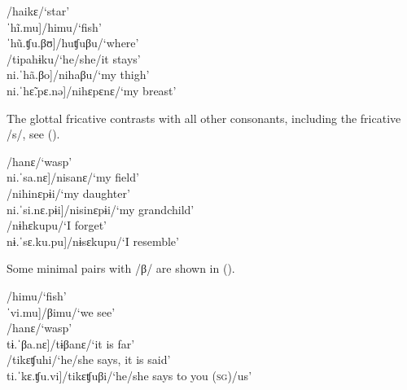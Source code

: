 \ea\label{ex:h}
\ea\label{ex:h.1}    \tab[ˈhãi.kɛ]\tab /haikɛ/\tab ‘star’\\
   \tab{[}ˈhĩ.mu]\tab /himu/\tab ‘fish’\\
   \tab{[}ˈhũ.ʧu.βʊ]\tab /huʧuβu/\tab ‘where’\\
\ex\label{ex:h.2} \tab[ti.pa.ˈhɨ̃.ku]\tab /tipahɨku/\tab ‘he/she/it stays’\\
   \tab{[}ni.ˈhã.βo]\tab /nihaβu/\tab ‘my thigh’\\
   \tab{[}ni.ˈhɛ̃.pɛ.nǝ]\tab /nihɛpɛnɛ/\tab ‘my breast’\\ %
\z
\xe

The glottal fricative contrasts with all other consonants, including the fricative /s/, see (). 

\ea\label{ex:h-s}
\ea     \tab[ˈhã.nɛ]\tab\tab /hanɛ/\tab\tab ‘wasp’\\
    \tab{[}ni.ˈsa.nɛ]\tab\tab /nisanɛ/\tab ‘my field’\\
\ex   {}\tab\tab /nihinɛpɨi/\tab ‘my daughter’\\
   \tab{[}ni.ˈsi.nɛ.pɨi]\tab\tab /nisinɛpɨi/\tab ‘my grandchild’\\
\ex   \tab[nɨ.ˈhɛ̃.ku.pu]\tab /nɨhɛkupu/\tab ‘I forget’\\
    \tab{[}nɨ.ˈsɛ.ku.pu]\tab /nɨsɛkupu/\tab ‘I resemble’\\%
\z
\xe
 
Some minimal pairs with /β/ are shown in ().
    
\ea\label{ex:h-b}
\ea    \tab[ˈhĩ.mu]\tab /himu/\tab ‘fish’\\
    \tab{[}ˈvi.mu]\tab /βimu/\tab ‘we see’\\
\ex   \tab[ˈhã.nɛ]\tab /hanɛ/\tab\tab ‘wasp’\\
    \tab{[}tɨ.ˈβa.nɛ]\tab /tɨβanɛ/\tab ‘it is far’\\
\ex    \tab[ti.ˈkɛ.ʧu.hĩ]\tab /tikɛʧuhi/\tab ‘he/she says, it is said’\\
   \tab{[}ti.ˈkɛ.ʧu.vi]\tab /tikɛʧuβi/\tab ‘he/she says to you (\textsc{sg})/us’\\%
\z
\xe
 

